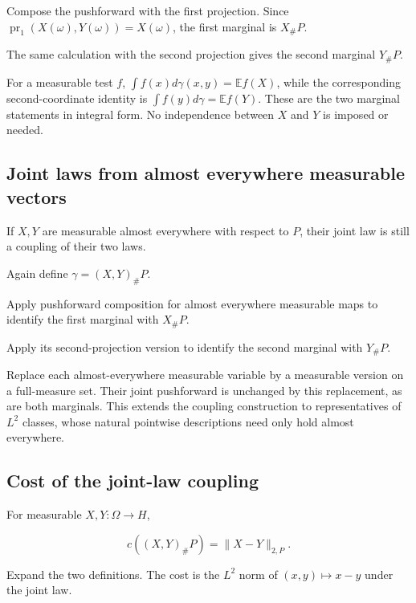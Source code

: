 \documentclass[11pt,a4paper]{article}
\begin{document}
Compose the pushforward with the first projection. Since \(\operatorname{pr}_1(X(\omega),Y(\omega))=X(\omega)\), the first marginal is \(X_\#P\).



The same calculation with the second projection gives the second marginal \(Y_\#P\).



For a measurable test \(f\), \(\int f(x)d\gamma(x,y)=\mathbb Ef(X)\), while the corresponding second-coordinate identity is \(\int f(y)d\gamma=\mathbb Ef(Y)\). These are the two marginal statements in integral form. No independence between \(X\) and \(Y\) is imposed or needed.


\subsection{\texorpdfstring{Joint laws from almost everywhere measurable vectors}{Joint laws from almost everywhere measurable vectors}}


If \(X,Y\) are measurable almost everywhere with respect to \(P\), their joint law is still a coupling of their two laws.



Again define \(\gamma=(X,Y)_\#P\).



Apply pushforward composition for almost everywhere measurable maps to identify the first marginal with \(X_\#P\).



Apply its second-projection version to identify the second marginal with \(Y_\#P\).



Replace each almost-everywhere measurable variable by a measurable version on a full-measure set. Their joint pushforward is unchanged by this replacement, as are both marginals. This extends the coupling construction to representatives of \(L^2\) classes, whose natural pointwise descriptions need only hold almost everywhere.


\subsection{\texorpdfstring{Cost of the joint-law coupling}{Cost of the joint-law coupling}}


For measurable \(X,Y:\Omega\to H\),

\[c((X,Y)_\#P)=\|X-Y\|_{2,P}.\]

Expand the two definitions. The cost is the \(L^2\) norm of \((x,y)\mapsto x-y\) under the joint law.
\end{document}
